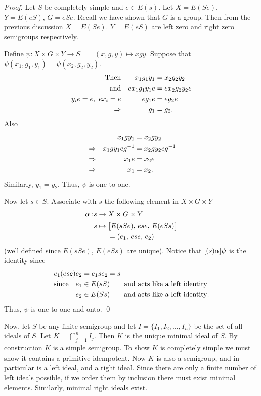 \begin{proof}  Let $S$ be completely simple and $e \in E(s)$.
Let $X = E(Se)$, $Y = E(eS)$, $G = eSe$.  
Recall we have shown that $G$ is a  group.  
Then from the previous discussion $X = E(Se)$.
$Y = E(eS)$ are left zero and right zero semigroups respectively.

     Define $\psi: X \times G \times Y \to S \qquad (x,g,y) \mapsto xgy$.
Suppose that $\psi(x_1,g_1,y_1) = \psi(x_2,g_2,y_2)$.
\[
     \alignedat{2}
     \hbox{Then}& &\quad
          x_1g_1y_1 &= x_2g_2y_2                        \\
     \hbox{and}& &\quad
          ex_1g_1y_1e &= ex_2g_2y_2e                    \\
     y_ie = e, \ ex_i = e& &
          eg_1e &= eg_2e                                \\
     \Rightarrow& &\quad
          g_1 &= g_2.
     \endalignedat
\]
Also
\[
     \alignedat{2}
     & &\quad x_1gy_1 &= x_2gy_2                        \\
     &\Rightarrow &\quad
          x_1gy_1eg^{-1} &= x_2gy_2eg^{-1}              \\
     &\Rightarrow &\quad
          x_1e &= x_2e                                  \\
     &\Rightarrow &\quad
          x_1 &= x_2.
     \endalignedat
\]
Similarly, $y_1 = y_2$.  
Thus, $\psi$ is one-to-one.

     Now let $s \in S$.  
Associate with $s$ the following element in $X \times G \times Y$
\[
     \aligned
     \a: &s \to X \times G \times Y                             \\
     &s \mapsto \bigl[ E(sSe),\, ese,\, E(eSs) \bigr]   \\
     &\qquad = (e_1,\, ese,\, e_2)
     \endaligned
\]
(well defined since $E(sSe)$, $E(eSs)$ are unique).  Notice that
$[(s)\alpha]\psi$ is the identity since
\[
     \aligned
     e_1(ese)e_2 &= e_1se_2 = s                         \\
     \hbox{since} \quad e_1 &\in E(sS)
          \qquad \hbox{and acts like a left identity}   \\
     e_2 &\in E(Ss) \qquad
          \hbox{and acts like a left identity}.
     \endaligned
\]
Thus, $\psi$ is one-to-one and onto.  
\qed
\end{proof}

Now, let $S$ be any finite semigroup and let
$I = \{ I_1,I_2,\ldots,I_n\}$ be the set of all ideals of $S$.  
Let $K = \bigcap\limits^n_{j=1} I_j$.  
Then $K$ is the unique minimal ideal of $S$.  
By construction $K$ is a simple semigroup.  
To show $K$ is completely simple we must show it contains a primitive idempotent.
Now $K$ is also a semigroup, and in particular is a left ideal, and a
right ideal.  
Since there are only a finite number of left ideals possible, if we order them by inclusion there must exist minimal elements.  
Similarly, minimal right ideals exist.  

